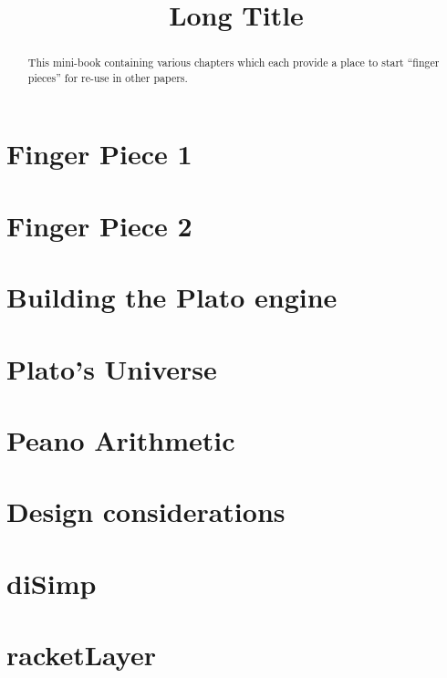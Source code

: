 \documentclass[a4paper,openany]{amsbook}
\begin{document}
\sloppy

\title[Short Title]{Long Title}

%

\begin{abstract}
This mini-book containing various chapters which each provide a place to start
``finger pieces'' for re-use in other papers.
\end{abstract} 
\maketitle 
\tableofcontents 


\chapter{Finger Piece 1}


\chapter{Finger Piece 2}


\chapter{Building the Plato engine}


\chapter{Plato's Universe}


\chapter{Peano Arithmetic}


\chapter{Design considerations}



\appendix
\chapter{diSimp}


\chapter{racketLayer}



\printbibliography
\end{document}
